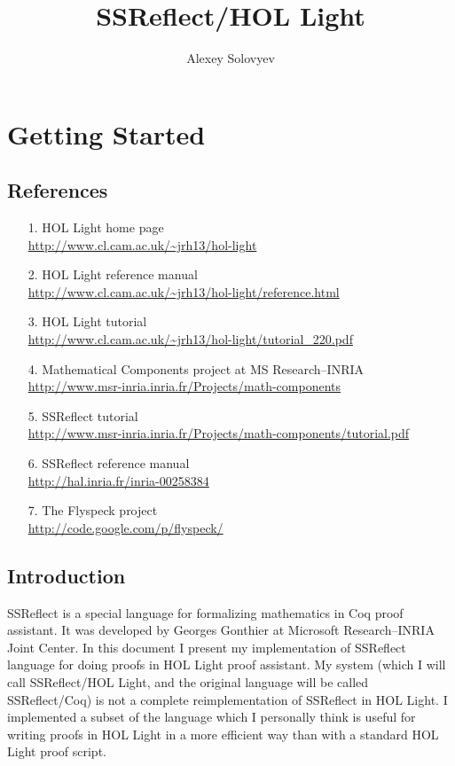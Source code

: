 \documentclass[a4paper]{article}
\title{SSReflect/HOL Light}
\author{Alexey Solovyev}
\begin{document}
\maketitle

\tableofcontents

\pagebreak
\section{Getting Started}

\subsection{References}
\begin{itemize}
\item[1.] HOL Light home page\\ 
	\url{http://www.cl.cam.ac.uk/~jrh13/hol-light}
\item[2.] HOL Light reference manual\\
	\url{http://www.cl.cam.ac.uk/~jrh13/hol-light/reference.html}
\item[3.] HOL Light tutorial\\
	\url{http://www.cl.cam.ac.uk/~jrh13/hol-light/tutorial_220.pdf}
\item[4.] Mathematical Components project at MS Research--INRIA\\
	\url{http://www.msr-inria.inria.fr/Projects/math-components}
\item[5.] SSReflect tutorial\\
	\url{http://www.msr-inria.inria.fr/Projects/math-components/tutorial.pdf}
\item[6.] SSReflect reference manual\\
	\url{http://hal.inria.fr/inria-00258384}
\item[7.] The Flyspeck project\\
	\url{http://code.google.com/p/flyspeck/}
\end{itemize}

\subsection{Introduction}
SSReflect is a special language for formalizing mathematics in Coq proof assistant. It was developed by Georges Gonthier at Microsoft Research--INRIA Joint Center. In this document I present my implementation of SSReflect language for doing proofs in HOL Light proof assistant. My system (which I will call SSReflect/HOL Light, and the original language will be called SSReflect/Coq) is not a complete reimplementation of SSReflect in HOL Light. I implemented a subset of the language which I personally think is useful for writing proofs in HOL Light in a more efficient way than with a standard HOL Light proof script.
\end{document}
